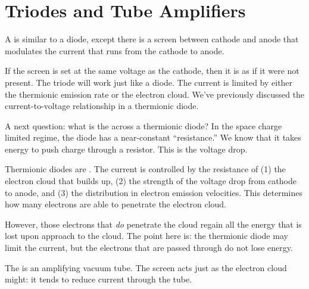 \documentclass[11pt, oneside]{amsart}
\begin{document}
\section{Triodes and Tube Amplifiers}

A  is similar to a diode, except there is a screen
between cathode and anode that modulates the current that runs from the
cathode to anode.

If the screen is set at the same voltage as the cathode, then it is as
if it were not present. The triode will work just like a diode. The
current is limited by either the thermionic emission rate or the
electron cloud. We've previously discussed the current-to-voltage
relationship in a thermionic diode.

A next question: what is the  across a thermionic
diode? In the space charge limited regime, the diode has a near-constant
``resistance.'' We know that it takes energy to push charge through a
resistor. This is the voltage drop.

Thermionic diodes are . The current is controlled by
the resistance of (1) the electron cloud that builds up, (2) the
strength of the voltage drop from cathode to anode, and (3) the
distribution in electron emission velocities. This determines how many
electrons are able to penetrate the electron cloud.

However, those electrons that \emph{do} penetrate the cloud regain all
the energy that is lost upon approach to the cloud. The point here is:
the thermionic diode may limit the current, but the electrons that are
passed through do not lose energy.

The  is an amplifying vacuum tube. The screen acts just
as the electron cloud might: it tends to reduce current through the
tube.
\end{document}
